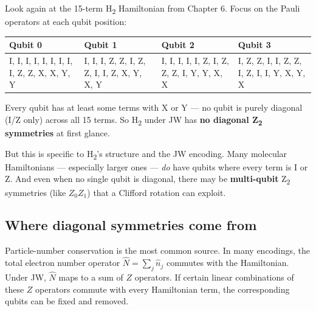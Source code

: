 \documentclass[
  11pt,
  oneside]{book}
\begin{document}
Look again at the 15-term H\textsubscript{2} Hamiltonian from Chapter 6. Focus on the
Pauli operators at each qubit position:

\begin{longtable}[]{@{}
  >{\centering\arraybackslash}p{}
  >{\centering\arraybackslash}p{}
  >{\centering\arraybackslash}p{}
  >{\centering\arraybackslash}p{}@{}}
\toprule\noalign{}
\begin{minipage}[b]{\linewidth}\centering
Qubit 0
\end{minipage} & \begin{minipage}[b]{\linewidth}\centering
Qubit 1
\end{minipage} & \begin{minipage}[b]{\linewidth}\centering
Qubit 2
\end{minipage} & \begin{minipage}[b]{\linewidth}\centering
Qubit 3
\end{minipage} \\
\midrule\noalign{}
\endhead
\bottomrule\noalign{}
\endlastfoot
I, I, I, I, I, I, I, I, I, Z, Z, X, X, Y, Y & I, I, I, Z, Z, I, Z, Z, I,
I, Z, X, Y, X, Y & I, I, I, I, I, Z, I, Z, Z, Z, I, Y, Y, X, X & I, Z,
Z, I, I, Z, Z, I, Z, I, I, Y, X, Y, X \\
\end{longtable}

Every qubit has at least some terms with X or Y --- no qubit is purely
diagonal (I/Z only) across all 15 terms. So H\textsubscript{2} under JW has \textbf{no
diagonal Z\textsubscript{2} symmetries} at first glance.

But this is specific to H\textsubscript{2}'s structure and the JW encoding. Many
molecular Hamiltonians --- especially larger ones --- \emph{do} have
qubits where every term is I or Z. And even when no single qubit is
diagonal, there may be \textbf{multi-qubit} Z\textsubscript{2} symmetries (like
\(Z_0 Z_1\)) that a Clifford rotation can exploit.

\subsection{Where diagonal symmetries come
from}\label{where-diagonal-symmetries-come-from}

Particle-number conservation is the most common source. In many
encodings, the total electron number operator
\(\hat{N} = \sum_j \hat{n}_j\) commutes with the Hamiltonian. Under JW,
\(\hat{N}\) maps to a sum of \(Z\) operators. If certain linear
combinations of these \(Z\) operators commute with every Hamiltonian
term, the corresponding qubits can be fixed and removed.
\end{document}
